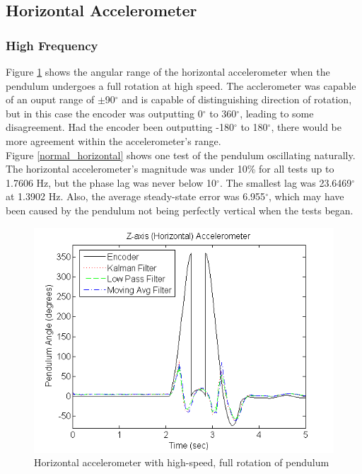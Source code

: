 \documentclass{article}
\theoremstyle{plain}
\theoremstyle{definition}
\theoremstyle{remark}
\begin{document}
\subsection{Horizontal Accelerometer}

\subsubsection{High Frequency}

Figure \ref{full_horizontal} shows the angular range of the horizontal accelerometer when the pendulum undergoes a full rotation at high speed. The acclerometer was capable of an ouput range of $\pm$90$^{\circ}$ and is capable of distinguishing direction of rotation, but in this case the encoder was outputting 0$^{\circ}$ to 360$^{\circ}$, leading to some disagreement. Had the encoder been outputting -180$^{\circ}$ to 180$^{\circ}$, there would be more agreement within the accelerometer's range.\\

Figure \ref{normal_horizontal} shows one test of the pendulum oscillating naturally. The horizontal accelerometer's magnitude was under 10\% for all tests up to 1.7606 Hz, but the phase lag was never below 10$^{\circ}$. The smallest lag was 23.6469$^{\circ}$ at 1.3902 Hz. Also, the average steady-state error was 6.955$^{\circ}$, which may have been caused by the pendulum not being perfectly vertical when the tests began.\\ 

\begin{figure}[hbt]
\begin{center}
\includegraphics[width = 12cm]{FullRotation_Horizontal.png}
\caption{Horizontal accelerometer with high-speed, full rotation of pendulum}
\label{full_horizontal}
\end{center}
\end{figure}
\end{document}
